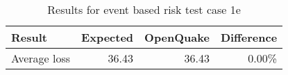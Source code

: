 \begin{table}[htbp]

\centering
\begin{tabular}{ l r r r }

\hline
\rowcolor{anti-flashwhite}
\bf{Result} & \bf{Expected} & \bf{OpenQuake} & \bf{Difference}\\
\hline
Average loss & 36.43 & 36.43 & 0.00\% \\
\hline
\end{tabular}

\caption{Results for event based risk test case 1e}
\label{tab:result-ebr-1e}
\end{table}